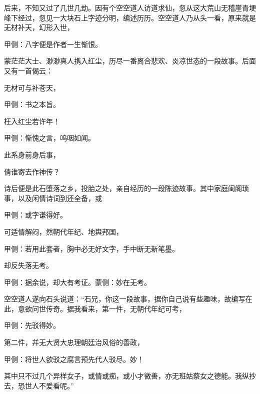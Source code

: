 \begin{parag}
    后来，不知又过了几世几劫。因有个空空道人访道求仙，忽从这大荒山无稽崖青埂峰下经过，忽见一大块石上字迹分明，编述历历。空空道人乃从头一看，原来就是无材补天，幻形入世，\begin{note}甲侧：八字便是作者一生惭恨。\end{note}蒙茫茫大士、渺渺真人携入红尘，历尽一番离合悲欢、炎凉世态的一段故事。后面又有一首偈云：
\end{parag}


\begin{poem}
    \begin{pl} 无材可与补苍天，\end{pl}\begin{note}甲侧：书之本旨。\end{note}

    \begin{pl} 枉入红尘若许年！\end{pl}\begin{note}甲侧：惭愧之言，呜咽如闻。\end{note}

    \begin{pl} 此系身前身后事，\end{pl}

    \begin{pl} 倩谁寄去作神传？\end{pl}
\end{poem}


\begin{parag}
    诗后便是此石堕落之乡，投胎之处，亲自经历的一段陈迹故事。其中家庭闺阁琐事，以及闲情诗词到还全备，或\begin{note}甲侧：或字谦得好。\end{note}可适情解闷，然朝代年纪、地舆邦国，\begin{note}甲侧：若用此套者，胸中必无好文字，手中断无新笔墨。\end{note}却反失落无考。\begin{note}甲侧：据余说，却大有考证。蒙侧：妙在无考。\end{note}
\end{parag}


\begin{parag}
    空空道人遂向石头说道：“石兄，你这一段故事，据你自己说有些趣味，故编写在此，意欲问世传奇。据我看来，第一件，无朝代年纪可考，\begin{note}甲侧：先驳得妙。\end{note}第二件，幷无大贤大忠理朝廷治风俗的善政，\begin{note}甲侧：将世人欲驳之腐言预先代人驳尽。妙！\end{note}其中只不过几个异样女子，或情或痴，或小才微善，亦无班姑蔡女之德能。我纵抄去，恐世人不爱看呢。”
\end{parag}


